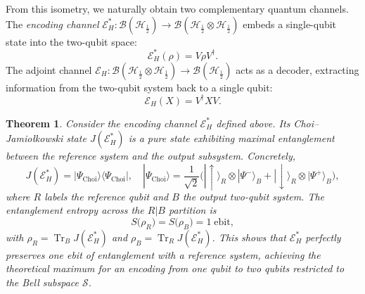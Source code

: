 \documentclass[12pt,a4paper]{article}
\newtheorem{theorem}{Theorem}[section]
\begin{document}
From this isometry, we naturally obtain two complementary quantum channels. The \emph{encoding channel} $\mathcal{E}_H^*: \mathcal{B}(\mathcal{H}_{\frac12}) \to \mathcal{B}(\mathcal{H}_{\frac12} \otimes \mathcal{H}_{\frac12})$ embeds a single-qubit state into the two-qubit space:
\[
\mathcal{E}_H^*(\rho) = V\rho V^\dagger.
\]
The adjoint channel $\mathcal{E}_H: \mathcal{B}(\mathcal{H}_{\frac12} \otimes \mathcal{H}_{\frac12}) \to \mathcal{B}(\mathcal{H}_{\frac12})$ acts as a decoder, extracting information from the two-qubit system back to a single qubit:
\[
\mathcal{E}_H(X) = V^\dagger X V.
\]




\begin{theorem}\label{thm:entropy}
Consider the encoding channel $\mathcal{E}_H^*$ defined above. Its Choi–Jamiołkowski state $J(\mathcal{E}_H^*)$ is a pure state exhibiting maximal entanglement between the reference system and the output subsystem. Concretely,
\[
J(\mathcal{E}_H^*) = |\Psi_{\mathrm{Choi}}\rangle\langle\Psi_{\mathrm{Choi}}|,
\quad
|\Psi_{\mathrm{Choi}}\rangle = \frac{1}{\sqrt{2}}\bigl( |\uparrow\rangle_R \otimes |\Psi^-\rangle_B + |\downarrow\rangle_R \otimes |\Psi^+\rangle_B \bigr),
\]
where $R$ labels the reference qubit and $B$ the output two-qubit system. The entanglement entropy across the $R|B$ partition is
\[
S\bigl(\rho_R\bigr) = S\bigl(\rho_B\bigr) = 1 \; \text{ebit},
\]
with $\rho_R = \operatorname{Tr}_B J(\mathcal{E}_H^*)$ and $\rho_B = \operatorname{Tr}_R J(\mathcal{E}_H^*)$. This shows that $\mathcal{E}_H^*$ perfectly preserves one ebit of entanglement with a reference system, achieving the theoretical maximum for an encoding from one qubit to two qubits restricted to the Bell subspace $\mathcal{S}$.
\end{theorem}
\end{document}
